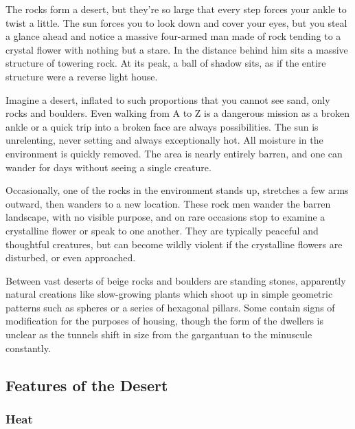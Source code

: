 \begin{multicols}{2}

\begin{boxtext}

	The rocks form a desert, but they're so large that every step forces your ankle to twist a little.
	The sun forces you to look down and cover your eyes, but you steal a glance ahead and notice a massive four-armed man made of rock tending to a crystal flower with nothing but a stare.
	In the distance behind him sits a massive structure of towering rock.
	At its peak, a ball of shadow sits, as if the entire structure were a reverse light house.

\end{boxtext}

Imagine a desert, inflated to such proportions that you cannot see sand, only rocks and boulders.
Even walking from A to Z is a dangerous mission as a broken ankle or a quick trip into a broken face are always possibilities.  The sun is unrelenting, never setting and always exceptionally hot.  All moisture in the environment is quickly removed.  The area is nearly entirely barren, and one can wander for days without seeing a single creature.

Occasionally, one of the rocks in the environment stands up, stretches a few arms outward, then wanders to a new location.
These rock men wander the barren landscape, with no visible purpose, and on rare occasions stop to examine a crystalline flower or speak to one another.
They are typically peaceful and thoughtful creatures, but can become wildly violent if the crystalline flowers are disturbed, or even approached.

Between vast deserts of beige rocks and boulders are standing stones, apparently natural creations like slow-growing plants which shoot up in simple geometric patterns such as spheres or a series of hexagonal pillars.  Some contain signs of modification for the purposes of housing, though the form of the dwellers is unclear as the tunnels shift in size from the gargantuan to the minuscule constantly.

\subsection{Features of the Desert}

\subsubsection{Heat}


\end{multicols}
